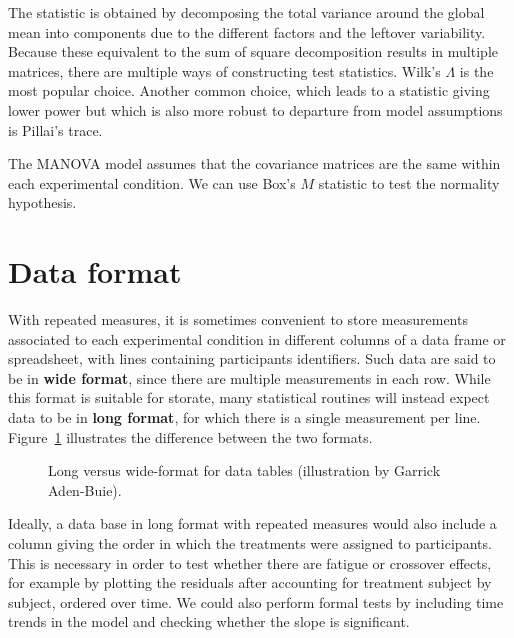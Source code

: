 \documentclass[
  11pt,
  letterpaper,
]{scrbook}
\theoremstyle{definition}
\theoremstyle{definition}
\theoremstyle{remark}
\begin{document}
The statistic is obtained by decomposing the total variance around the
global mean into components due to the different factors and the
leftover variability. Because these equivalent to the sum of square
decomposition results in multiple matrices, there are multiple ways of
constructing test statistics. Wilk's \(\Lambda\) is the most popular
choice. Another common choice, which leads to a statistic giving lower
power but which is also more robust to departure from model assumptions
is Pillai's trace.

The MANOVA model assumes that the covariance matrices are the same
within each experimental condition. We can use Box's \(M\) statistic to
test the normality hypothesis.

\section{Data format}\label{data-format}

With repeated measures, it is sometimes convenient to store measurements
associated to each experimental condition in different columns of a data
frame or spreadsheet, with lines containing participants identifiers.
Such data are said to be in \textbf{wide format}, since there are
multiple measurements in each row. While this format is suitable for
storate, many statistical routines will instead expect data to be in
\textbf{long format}, for which there is a single measurement per line.
Figure~\ref{fig-longvswide} illustrates the difference between the two
formats.

\begin{figure}[ht!]


\caption{\label{fig-longvswide}Long versus wide-format for data tables
(illustration by Garrick Aden-Buie).}

\end{figure}%

Ideally, a data base in long format with repeated measures would also
include a column giving the order in which the treatments were assigned
to participants. This is necessary in order to test whether there are
fatigue or crossover effects, for example by plotting the residuals
after accounting for treatment subject by subject, ordered over time. We
could also perform formal tests by including time trends in the model
and checking whether the slope is significant.
\end{document}
